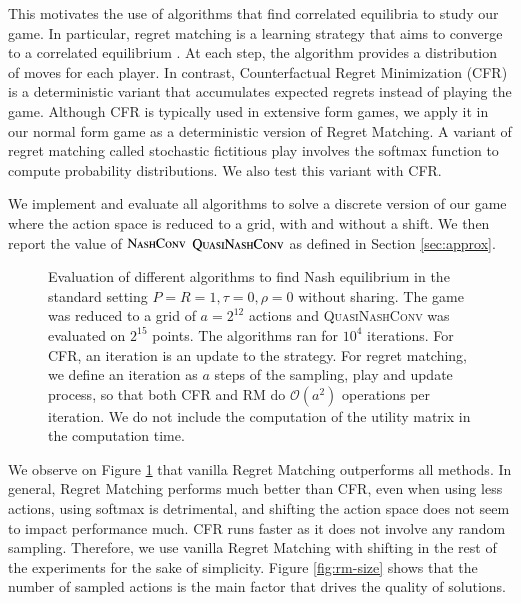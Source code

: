 \documentclass[preprint,12pt,authoryear,doubleblind]{elsarticle}
\theoremstyle{definition}
\begin{document}
This motivates the use of algorithms that find correlated equilibria to study our game. In particular, regret matching is a learning strategy that aims to converge to a correlated equilibrium \citep{Hart1997-nk}. At each step, the algorithm provides a distribution of moves for each player. In contrast, Counterfactual Regret Minimization (CFR) \citep{neller2013introduction} is a deterministic variant that accumulates expected regrets instead of playing the game. Although CFR is typically used in extensive form games, we apply it in our normal form game as a deterministic version of Regret Matching.
A variant of regret matching called stochastic fictitious play \citep{fudenberg1993learning} involves the softmax function to compute probability distributions. We also test this variant with CFR.

We implement and evaluate all algorithms to solve a discrete version of our game where the action space is reduced to a grid, with and without a shift. We then report the value of $\textsc{NashConv}$ $\textsc{QuasiNashConv}$ as defined in Section \ref{sec:approx}.


\begin{figure}[htbp]
  \centering
  \begin{minipage}[t]{0.48\textwidth}
    \centering
    
  \end{minipage}
  \hfill
  \begin{minipage}[t]{0.48\textwidth}
    \centering
    
  \end{minipage}
  \caption{Evaluation of different algorithms to find Nash equilibrium in the standard setting $P=R=1, \tau=0, \rho=0$ without sharing. The game was reduced to a grid of $a=2^{12}$ actions and \textsc{QuasiNashConv} was evaluated on $2^{15}$ points. The algorithms ran for $10^4$ iterations. For CFR, an iteration is an update to the strategy. For regret matching, we define an iteration as $a$ steps of the sampling, play and update process, so that both CFR and RM do $\mathcal{O}(a^2)$ operations per iteration. We do not include the computation of the utility matrix in the computation time.}
  \label{fig:rm-different}  
\end{figure}

We observe on Figure \ref{fig:rm-different} that vanilla Regret Matching outperforms all methods. In general, Regret Matching performs much better than CFR, even when using less actions, using softmax is detrimental, and shifting the action space does not seem to impact performance much. CFR runs faster as it does not involve any random sampling. Therefore, we use vanilla Regret Matching with shifting in the rest of the experiments for the sake of simplicity. Figure \ref{fig:rm-size} shows that the number of sampled actions is the main factor that drives the quality of solutions.
\end{document}
